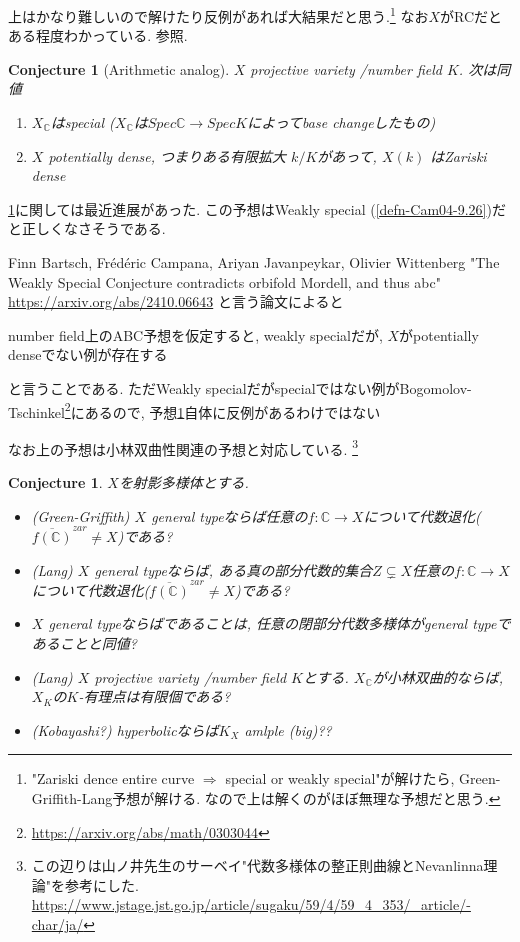 \documentclass[dvipdfmx,a4paper,11pt]{article} %
\newtheorem{conj}[thm]{Conjecture}
\theoremstyle{definition}
\theoremstyle{remark}
\numberwithin{equation}{section}
\newcommand{\C}{\mathbb{C}}
\begin{document}
上はかなり難しいので解けたり反例があれば大結果だと思う.\footnote{"Zariski dence entire curve $\Rightarrow$ special or weakly special"が解けたら, Green-Griffith-Lang予想が解ける. なので上は解くのがほぼ無理な予想だと思う. }
なお$X$がRCだとある程度わかっている. \cite{CW23}参照. 


\begin{conj}[Arithmetic analog]
\label{conj-arithmetic}
\( X \) projective variety /number field \( K \). 
次は同値
\begin{enumerate}
\item[1. ] \( X_{\C} \)はspecial ($X_\C$は$Spec \C \to Spec K$によってbase changeしたもの)
\item[2. ] \( X \) potentially dense, つまりある有限拡大 \( k/K \)があって, \( X(k) \) はZariski dense
\end{enumerate}
\end{conj}

\ref{conj-arithmetic}に関しては最近進展があった. 
この予想はWeakly special (\ref{defn-Cam04-9.26})だと正しくなさそうである. 

Finn Bartsch, Frédéric Campana, Ariyan Javanpeykar, Olivier Wittenberg "The Weakly Special Conjecture contradicts orbifold Mordell, and thus abc" \url{https://arxiv.org/abs/2410.06643}
と言う論文によると
\begin{center}
number field上のABC予想を仮定すると, weakly specialだが, \( X \)がpotentially denseでない例が存在する
\end{center}
と言うことである. 
ただWeakly specialだがspecialではない例がBogomolov-Tschinkel\footnote{\url{https://arxiv.org/abs/math/0303044}}にあるので, 予想\ref{conj-arithmetic}自体に反例があるわけではない

なお上の予想は小林双曲性関連の予想と対応している. \footnote{この辺りは山ノ井先生のサーベイ"代数多様体の整正則曲線とNevanlinna理論"を参考にした. \url{https://www.jstage.jst.go.jp/article/sugaku/59/4/59_4_353/_article/-char/ja/}}
\begin{conj}
$X$を射影多様体とする.
\begin{itemize}
\item (Green-Griffith) $X$ general typeならば任意の$f : \C \to X$について代数退化($\overline{f(\C)}^{zar} \neq X$)である?
\item (Lang) $X$ general typeならば, ある真の部分代数的集合$Z \subsetneq X$任意の$f : \C \to X$について代数退化($\overline{f(\C)}^{zar} \neq X$)である?
\item $X$ general typeならばであることは, 任意の閉部分代数多様体がgeneral typeであることと同値?
\item  (Lang) \( X \) projective variety /number field \( K \)とする. \( X_{\C} \)が小林双曲的ならば, $X_K$の$K$-有理点は有限個である?
\item (Kobayashi?) hyperbolicならば$K_X$ amlple (big)??
\end{itemize}

\end{conj}
\end{document}
